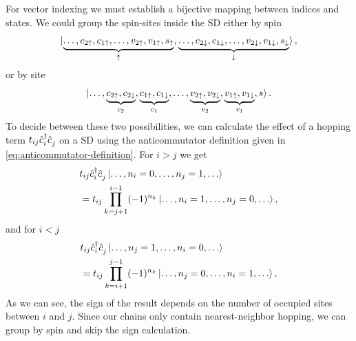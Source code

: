 For vector indexing we must establish a bijective mapping between
indices and states.
We could group the spin-sites inside the SD either by spin
\begin{equation}
    \label{eq:sort-by-spin}
    \ket{
        \underbrace{
            \ldots, c_{2\uparrow}, c_{1\uparrow}, \ldots, v_{2\uparrow}, v_{1\uparrow}, s_\uparrow
        }_{\uparrow},
        \underbrace{
            \ldots, c_{2\downarrow}, c_{1\downarrow}, \ldots, v_{2\downarrow}, v_{1\downarrow}, s_\downarrow
        }_{\downarrow}
    },
\end{equation}
or by site
\begin{equation}
    \label{eq:sort-by-site}
    \ket{
        \ldots,
        \underbrace{c_{2\uparrow}, c_{2\downarrow}}_{c_2},
        \underbrace{c_{1\uparrow}, c_{1\downarrow}}_{c_1},
        \ldots,
        \underbrace{v_{2\uparrow}, v_{2\downarrow}}_{v_2},
        \underbrace{v_{1\uparrow}, v_{1\downarrow}}_{v_1},
        s
    }.
\end{equation}
To decide between these two possibilities,
we can calculate the effect of a hopping term $t_{ij} \cdag_i \cc_j$ on a SD
using the anticommutator definition given in
\cref{eq:anticommutator-definition}.
For $i > j$ we get
\begin{equation}
    \label{eq:hopping-1}
    \begin{split}
         & t_{ij} \cdag_i \cc_j \ket{\ldots, n_i=0, \ldots, n_j=1, \ldots} \\
         & = t_{ij} \prod_{k=j+1}^{i-1} (-1)^{n_k}
        \ket{\ldots, n_i=1, \ldots, n_j=0, \ldots},
    \end{split}
\end{equation}
and for $i < j$
\begin{equation}
    \label{eq:hopping-2}
    \begin{split}
         & t_{ij} \cdag_i \cc_j \ket{\ldots, n_j=1, \ldots, n_i=0, \ldots} \\
         & = t_{ij} \prod_{k=i+1}^{j-1} (-1)^{n_k}
        \ket{\ldots, n_j=0, \ldots, n_i=1, \ldots},
    \end{split}
\end{equation}
As we can see,
the sign of the result depends on the number of occupied
sites between $i$ and $j$.
Since our chains only contain nearest-neighbor hopping,
we can group by spin and skip the sign calculation.

